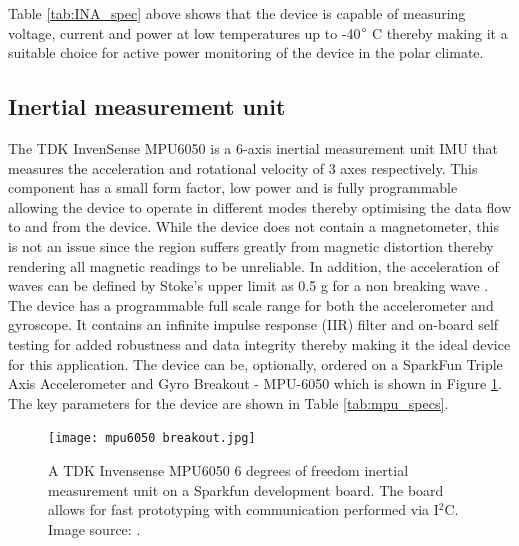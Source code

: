 Table \ref{tab:INA_spec} above shows that the device is capable of measuring voltage, current and power at low temperatures up to -40$\degree$ C thereby making it a suitable choice for active power monitoring of the device in the polar climate.

\subsection{Inertial measurement unit}

The TDK InvenSense MPU6050\cite{mpu6050} is a 6-axis inertial measurement unit IMU that measures the acceleration and rotational velocity of 3 axes respectively. This component has a small form factor, low power and is fully programmable allowing the device to operate in different modes thereby optimising the data flow to and from the device. While the device does not contain a magnetometer, this is not an issue since the region suffers greatly from magnetic distortion \cite{kohout2015device} thereby rendering all magnetic readings to be unreliable. In addition, the acceleration of waves can be defined by Stoke's upper limit as 0.5 g for a non breaking wave  \cite{kohout2015device}. The device has a programmable full scale range for both the accelerometer and gyroscope. It contains an infinite impulse response (IIR) filter and on-board self testing for added robustness and data integrity thereby making it  the ideal device for this application. The device can be, optionally, ordered on a SparkFun Triple Axis Accelerometer and Gyro Breakout - MPU-6050 which is shown in Figure \ref{fig:mpubreakout}. The key parameters for the device are shown in Table \ref{tab:mpu_specs}.

\begin{figure}[H]
	\centering
	\texttt{[image: mpu6050 breakout.jpg]}
	\caption{A TDK Invensense MPU6050 6 degrees of freedom inertial measurement unit on a Sparkfun development board. The board allows for fast prototyping with communication performed via I$^2$C. Image source: \cite{mpu6050breakout}.}
	\label{fig:mpubreakout}
\end{figure}

